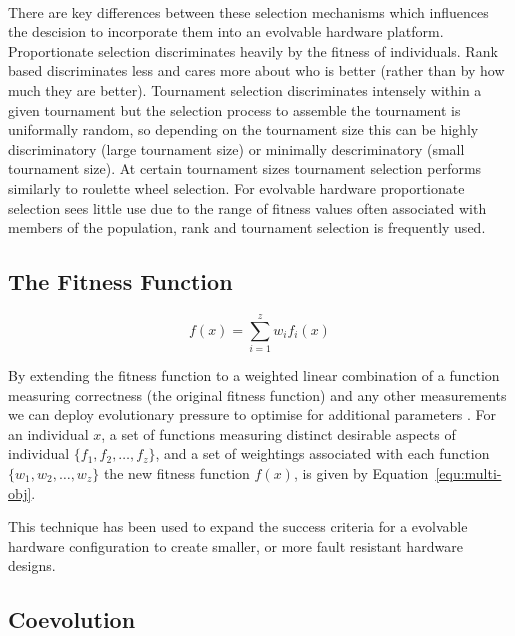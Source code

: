 \paragraph{}
There are key differences between these selection mechanisms which influences
the descision to incorporate them into an evolvable hardware platform. Proportionate
selection discriminates heavily by the fitness of individuals. Rank based
discriminates less and cares more about who is better (rather than by how
much they are better). Tournament selection discriminates intensely within a given
tournament but the selection process to assemble the tournament is uniformally
random, so depending on the tournament size this can be highly discriminatory
(large tournament size) or minimally descriminatory (small tournament size).
At certain tournament sizes tournament selection performs similarly to roulette
wheel selection.
For evolvable hardware proportionate selection sees little use due to the range
of fitness values often associated with members of the population, rank and
tournament selection is frequently used.

\subsection{The Fitness Function}

\begin{equation}
	f(x) = \sum_{i=1}^{z} w_i f_i(x)
	\label{equ:multi-obj}
\end{equation}

By extending the fitness function to a weighted linear combination of a function
measuring correctness (the original fitness function)
and any other measurements we can deploy evolutionary pressure to optimise for
additional parameters \cite{deJong:2001:RBP:2955239.2955241}. For an individual
$x$, a set of functions measuring distinct desirable aspects of individual
$\{f_1,f_2,\ldots,f_z\}$, and a set of weightings associated with each function
$\{w_1,w_2,\ldots,w_z\}$ the new fitness function $f(x)$, is given by
Equation~\ref{equ:multi-obj}.

This technique has been used to expand the success criteria for a evolvable hardware configuration
to create smaller, or more fault resistant hardware designs.

\subsection{Coevolution}

